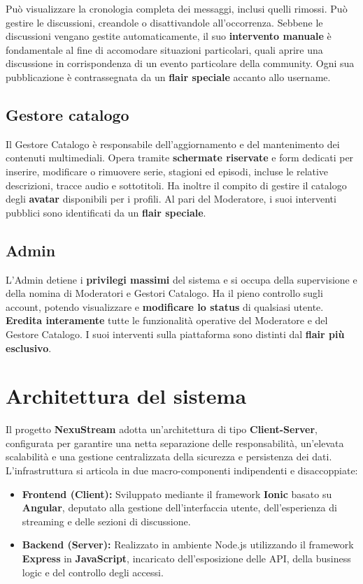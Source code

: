Può visualizzare la cronologia completa dei messaggi, inclusi quelli rimossi. Può gestire le discussioni, creandole o disattivandole all'occorrenza. Sebbene le discussioni vengano gestite automaticamente, il suo \textbf{intervento manuale} è fondamentale al fine di accomodare situazioni particolari, quali aprire una discussione in corrispondenza di un evento particolare della community. Ogni sua pubblicazione è contrassegnata da un \textbf{flair speciale} accanto allo username.

\subsection{Gestore catalogo}
Il Gestore Catalogo è responsabile dell'aggiornamento e del mantenimento dei contenuti multimediali. Opera tramite \textbf{schermate riservate} e form dedicati per inserire, modificare o rimuovere serie, stagioni ed episodi, incluse le relative descrizioni, tracce audio e sottotitoli. Ha inoltre il compito di gestire il catalogo degli \textbf{avatar} disponibili per i profili. Al pari del Moderatore, i suoi interventi pubblici sono identificati da un \textbf{flair speciale}.

\subsection{Admin}
L'Admin detiene i \textbf{privilegi massimi} del sistema e si occupa della supervisione e della nomina di Moderatori e Gestori Catalogo. Ha il pieno controllo sugli account, potendo visualizzare e \textbf{modificare lo status} di qualsiasi utente. \textbf{Eredita interamente} tutte le funzionalità operative del Moderatore e del Gestore Catalogo. I suoi interventi sulla piattaforma sono distinti dal \textbf{flair più esclusivo}.

\section{Architettura del sistema}
Il progetto \textbf{NexuStream} adotta un'architettura di tipo \textbf{Client-Server}, configurata per garantire una netta separazione delle responsabilità, un'elevata scalabilità e una gestione centralizzata della sicurezza e persistenza dei dati. L'infrastruttura si articola in due macro-componenti indipendenti e disaccoppiate:

\begin{itemize}
    \item \textbf{Frontend (Client):} Sviluppato mediante il framework \textbf{Ionic} basato su \textbf{Angular}, deputato alla gestione dell'interfaccia utente, dell'esperienza di streaming e delle sezioni di discussione.
    \item \textbf{Backend (Server):} Realizzato in ambiente Node.js utilizzando il framework \textbf{Express} in \textbf{JavaScript}, incaricato dell'esposizione delle API, della business logic e del controllo degli accessi.
\end{itemize}

